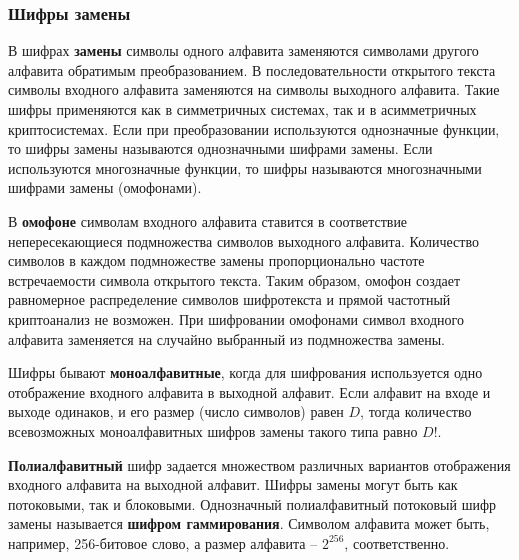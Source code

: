 \subsubsection{Шифры замены}

В шифрах \textbf{замены} символы одного алфавита заменяются символами другого алфавита обратимым преобразованием. В последовательности открытого текста символы входного алфавита заменяются на символы выходного алфавита. Такие шифры применяются как в симметричных системах, так и в асимметричных криптосистемах. Если при преобразовании используются однозначные функции, то шифры замены называются однозначными шифрами замены. Если используются многозначные функции, то шифры называются многозначными шифрами замены (омофонами).

В \textbf{омофоне} символам входного алфавита ставится в соответствие непересекающиеся подмножества символов выходного алфавита. Количество символов в каждом подмножестве замены пропорционально частоте встречаемости символа открытого текста. Таким образом, омофон создает равномерное распределение символов шифротекста и прямой частотный криптоанализ не возможен. При шифровании омофонами символ входного алфавита заменяется на случайно выбранный из подмножества замены.

Шифры бывают \textbf{моноалфавитные}, когда для шифрования используется одно отображение входного алфавита в выходной алфавит. Если алфавит на входе и выходе одинаков, и его размер (число символов) равен $D$, тогда количество всевозможных моноалфавитных шифров замены такого типа равно $D!$.

\textbf{Полиалфавитный} шифр задается множеством различных вариантов отображения входного алфавита на выходной алфавит. Шифры замены могут быть как потоковыми, так и блоковыми. Однозначный полиалфавитный потоковый шифр замены называется \textbf{шифром гаммирования}. Символом алфавита может быть, например, 256-битовое слово, а размер алфавита -- $2^{256}$, соответственно.
